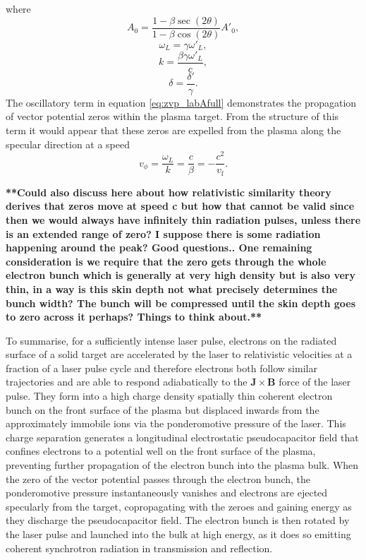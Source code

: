 where
\begin{equation}
	A_0 = \frac{1-\beta \sec{(2\theta)}}{1 - \beta\cos{(2\theta)}}A'_0,
\end{equation}
\begin{equation}
	\omega_L = \gamma \omega'_L,
\end{equation}
\begin{equation}
	k = \frac{\beta \gamma\omega'_L}{c},
\end{equation}
\begin{equation}
	\delta = \frac{\delta'}{\gamma}.
\end{equation}
The oscillatory term in equation \ref{eq:zvp_labAfull} demonstrates the propagation of vector potential zeros within the plasma target. From the structure of this term it would appear that these zeros are expelled from the plasma along the specular direction at a speed
\begin{equation}
	v_\phi = \frac{\omega_L}{k} = \frac{c}{\beta} = -\frac{c^2}{v_\mathrm{f}}.
\end{equation}

\textbf{**Could also discuss here about how relativistic similarity theory derives that zeros move at speed c but how that cannot be valid since then we would always have infinitely thin radiation pulses, unless there is an extended range of zero? I suppose there is some radiation happening around the peak? Good questions..
One remaining consideration is we require that the zero gets through the whole electron bunch which is generally at very high density but is also very thin, in a way is this skin depth not what precisely determines the bunch width? The bunch will be compressed until the skin depth goes to zero across it perhaps? Things to think about.**}

To summarise, for a sufficiently intense laser pulse, electrons on the radiated surface of a solid target are accelerated by the laser to relativistic velocities at a fraction of a laser pulse cycle and therefore electrons both follow similar trajectories and are able to respond adiabatically to the $\mathbf{J}\times \mathbf{B}$ force of the laser pulse. They form into a high charge density spatially thin coherent electron bunch on the front surface of the plasma but displaced inwards from the approximately immobile ions via the ponderomotive pressure of the laser. This charge separation generates a longitudinal electrostatic pseudocapacitor field that confines electrons to a potential well on the front surface of the plasma, preventing further propagation of the electron bunch into the plasma bulk. When the zero of the vector potential passes through the electron bunch, the ponderomotive pressure instantaneously vanishes and electrons are ejected specularly from the target, copropagating with the zeroes and gaining energy as they discharge the pseudocapacitor field. The electron bunch is then rotated by the laser pulse and launched into the bulk at high energy, as it does so emitting coherent synchrotron radiation in transmission and reflection.

